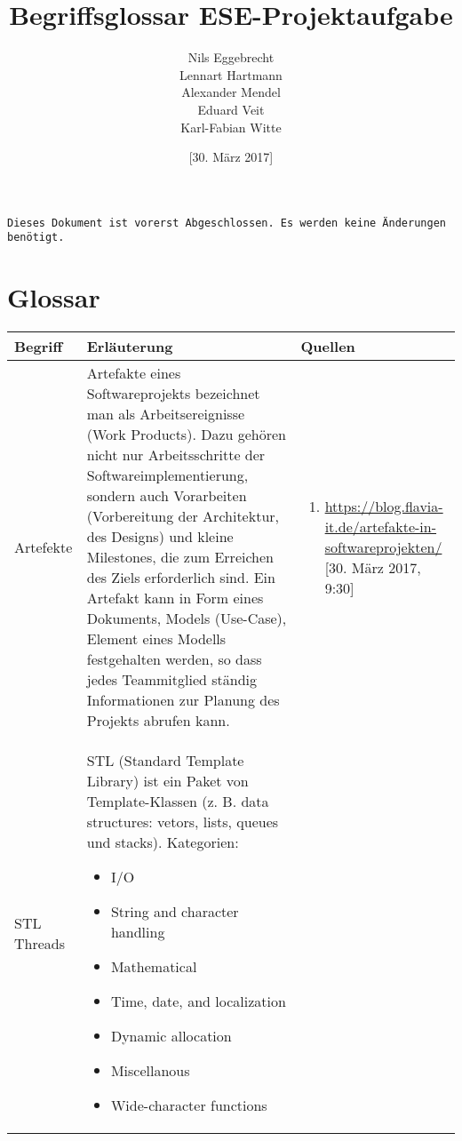 \documentclass[10pt]{article}
\title{\textbf{Begriffsglossar ESE-Projektaufgabe}}
\author{Nils Eggebrecht\\
		Lennart Hartmann\\
		Alexander Mendel\\
		Eduard Veit\\
		Karl-Fabian Witte}
\date{[30. März 2017]}
\begin{document}
\newenvironment{sourceenum}{
  \vspace{-\baselineskip}
    \begin{enumerate}[leftmargin=*,noitemsep,topsep=0pt,partopsep=0pt]}
   {\end{enumerate}}
\maketitle
\texttt {Dieses Dokument ist vorerst Abgeschlossen. Es werden keine Änderungen benötigt.}
\section{Glossar}

\begin{longtable}{|p{} p{} p{}|}
	\hline
	\textbf{Begriff} & \textbf{Erläuterung} & \textbf{Quellen} \\ [5pt]
	\hline
	\endhead
	\hline 
	\endfoot
	
	Artefekte &
	 Artefakte eines Softwareprojekts bezeichnet man als Arbeitsereignisse (Work Products). Dazu gehören nicht nur Arbeitsschritte der Softwareimplementierung, sondern auch Vorarbeiten (Vorbereitung der Architektur, des Designs) und kleine Milestones, die zum Erreichen des Ziels erforderlich sind. Ein Artefakt kann in Form eines Dokuments, Models (Use-Case), Element eines Modells festgehalten werden, so dass jedes Teammitglied ständig Informationen zur Planung des Projekts abrufen kann.
	 & 
	\begin{sourceenum}

		\item \url{https://blog.flavia-it.de/artefakte-in-softwareprojekten/} [30. März 2017, 9:30]
		
	\end{sourceenum}
\\	\hline
	

STL Threads &
		STL (Standard Template Library) ist ein Paket von Template-Klassen (z. B. data structures: vetors, lists, queues und stacks). 
		Kategorien: 
		\begin{itemize}
		\item I/O
		\item String and character handling
		\item Mathematical
		\item Time, date, and localization
		\item Dynamic allocation
		\item Miscellanous
		\item Wide-character functions
		\end{itemize}
		

\end{longtable}
\end{document}

